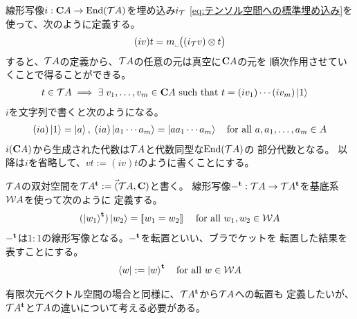 	線形写像$i:\mathbf{C} A\to {\ensuremath{\operatorname{End}}}({{\mathcal{T}}} A)$を埋め込み$i_{{\mathcal{T}}}$
	\eqref{eq:テンソル空間への標準埋め込み}を使って、次のように定義する。
	\begin{equation*}\begin{split}
		(iv)t = m_\myspace\bigl((i_\T v)\otimes t\bigr)
	\end{split}\end{equation*}
	すると、${{\mathcal{T}}} A$の定義から、${{\mathcal{T}}} A$の任意の元は真空に$\mathbf{C} A$の元を
	順次作用させていくことで得ることができる。
	\begin{equation*}\begin{split}
		t\in {\ensuremath{{\mathcal{T}}}} A &\implies \exists\; v_1,\dots,v_m\in\mathbf{C} A
		\text{ such that } t = (iv_1)\cdots(iv_m)\mathinner{|{1}\rangle}
	\end{split}\end{equation*}
	$i$を文字列で書くと次のようになる。
	\begin{equation*}\begin{split}
		(ia)\mathinner{|{1}\rangle} = \mathinner{|{a}\rangle},\; (ia)\mathinner{|{a_1\cdots a_m}\rangle} = \mathinner{|{aa_1\cdots a_m}\rangle}
		\quad\text{for all }a,a_1,\dots,a_m\in A
	\end{split}\end{equation*}
	$i(\mathbf{C} A)$から生成された代数は${{\mathcal{T}}} A$と代数同型な${\operatorname{End}}({{\mathcal{T}}} A)$の
	部分代数となる。
	以降は$i$を省略して、$vt:=(iv)t$のように書くことにする。

	${{\mathcal{T}}} A$の双対空間を${{\mathcal{T}}} A^{\mathbf{t}}:=\Vec({{\mathcal{T}}} A,\mathbf{C})$と書く。
	線形写像$-^{\mathbf{t}}:{{\mathcal{T}}} A\to {\ensuremath{{\mathcal{T}}}} A^{\mathbf{t}}$を基底系${{\mathcal{W}}} A$を使って次のように
	定義する。
	\begin{equation*}\begin{split}
		(\mathinner{|{w_1}\rangle}^{\mathbf{t}})\mathinner{|{w_2}\rangle} = [\![w_1 = w_2]\!]\;
		\quad\text{for all }w_1,w_2\in{\ensuremath{{\mathcal{W}}}} A
	\end{split}\end{equation*}
	$-^{\mathbf{t}}$は$1:1$の線形写像となる。$-^{\mathbf{t}}$を転置といい、ブラでケットを
	転置した結果を表すことにする。
	\begin{equation*}\begin{split}
		\mathinner{\langle{w}|} := \mathinner{|{w}\rangle}^{\mathbf{t}} \quad\text{for all } w\in{\ensuremath{{\mathcal{W}}}} A
	\end{split}\end{equation*}

	有限次元ベクトル空間の場合と同様に、${{\mathcal{T}}} A^{\mathbf{t}}$から${{\mathcal{T}}} A$への転置も
	定義したいが、${{\mathcal{T}}} A^{\mathbf{t}}$と${{\mathcal{T}}} A$の違いについて考える必要がある。

